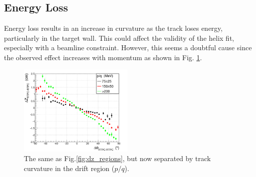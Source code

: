 \documentclass[amsmath,amssymb,notitlepage,11pt]{revtex4-1}
\begin{document}
\subsection{Energy Loss}
Energy loss results in an increase in curvature as the track loses energy, particularly in the target wall.  This could affect the validity of the helix fit, especially with a beamline constraint.  However, this seems a doubtful cause since the observed effect increases with momentum as shown in Fig. \ref{fig:dz_mom}.
\begin{figure}[htbp]\centering
    \includegraphics[width=0.49\textwidth]{pics/dzdthe_pbins_small.png}
    \caption{The same as Fig.\ref{fig:dz_regions}, but now separated by track curvature in the drift region ($p/q$).\label{fig:dz_mom}}
\end{figure}
\end{document}
